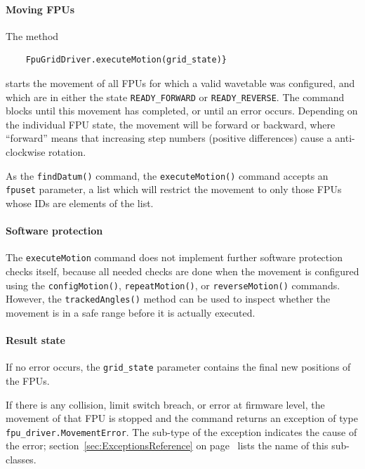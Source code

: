 \documentclass[11pt,a4paper]{scrartcl}
\begin{document}
\paragraph{Moving FPUs}

\begin{sloppypar}
  The method
  \begin{verbatim}
    FpuGridDriver.executeMotion(grid_state)}
  \end{verbatim}
  starts the movement of all FPUs for which a valid wavetable was
  configured, and which are in either the state
  \texttt{READY\_FORWARD} or \texttt{READY\_REVERSE}. The command
  blocks until this movement has completed, or until an error
  occurs. Depending on the individual FPU state, the movement will be
  forward or backward, where ``forward'' means that increasing step
  numbers (positive differences) cause a anti-clockwise rotation.
\end{sloppypar}

As the \texttt{findDatum()} command, the \texttt{executeMotion()}
command accepts an \texttt{fpuset} parameter, a list which will
restrict the movement to only those FPUs whose IDs are elements of the
list.

\paragraph{Software protection}
The \texttt{executeMotion} command does not implement further software
protection checks itself, because all needed checks are done when the
movement is configured using the \texttt{configMotion()},
\texttt{repeatMotion()}, or \texttt{reverseMotion()}
commands. However, the \texttt{trackedAngles()} method can be used to
inspect whether the movement is in a safe range before it is actually
executed.

\paragraph{Result state}
If no error occurs, the \texttt{grid\_state} parameter contains the
final new positions of the FPUs.

If there is any collision, limit switch breach, or error at firmware
level, the movement of that FPU is stopped and the command returns an
exception of type \texttt{fpu\_driver.MovementError}. The sub-type of
the exception indicates the cause of the error;
section~\ref{sec:ExceptionsReference} on
page~\pageref{sec:ExceptionsReference} lists the name of this
sub-classes.
\end{document}
